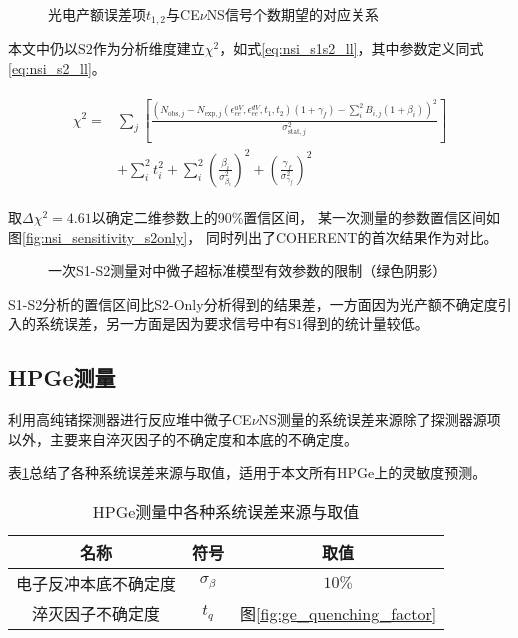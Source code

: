 \begin{figure}
  \centering
  
  \caption{\label{fig:exp_s1s2_t1t2} 光电产额误差项$t_{1,2}$与CE$\nu$NS信号个数期望的对应关系}
\end{figure}

本文中仍以$\mathrm{S2}$作为分析维度建立$\chi^2$，如式\ref{eq:nsi_s1s2_ll}，其中参数定义同式\ref{eq:nsi_s2_ll}。

\begin{align}
    \label{eq:nsi_s1s2_ll}
    \begin{split}
    \chi^2 =& \sum_j\left[\frac{\left(N_{\mathrm{obs},j} - N_{\mathrm{exp},j}(\epsilon^{uV}_{ee}, \epsilon^{dV}_{ee}, t_1, t_2)(1 + \gamma_f) 
    - \sum_{i}^2 B_{i,j}(1 + \beta_i)\right)^2}{\sigma^2_{\mathrm{stat},j}}\right] \\
    & + \sum_{i}^2 t_i^2 + \sum_{i}^2(\frac{\beta_i}{\sigma^2_{\beta_i}})^2 + (\frac{\gamma_f}{\sigma^2_{\gamma_f}})^2
    \end{split}
\end{align}

取$\Delta \chi^2=4.61$以确定二维参数上的90\%置信区间，
某一次测量的参数置信区间如图\ref{fig:nsi_sensitivity_s2only}，
同时列出了COHERENT的首次结果作为对比\cite{akimov_observation_2017}。

\begin{figure}
  \centering
  
  \caption{\label{fig:nsi_sensitivity_s1s2} 一次S1-S2测量对中微子超标准模型有效参数的限制（绿色阴影）}
\end{figure}

S1-S2分析的置信区间比S2-Only分析得到的结果差，一方面因为光产额不确定度引入的系统误差，另一方面是因为要求信号中有$\mathrm{S1}$得到的统计量较低。

\subsection{HPGe测量}

利用高纯锗探测器进行反应堆中微子CE$\nu$NS测量的系统误差来源除了探测器源项以外，主要来自淬灭因子的不确定度和本底的不确定度。

表\ref{tab:sys_error_ge}总结了各种系统误差来源与取值，适用于本文所有HPGe上的灵敏度预测。

\begin{table}
  \centering
  \caption{HPGe测量中各种系统误差来源与取值}
  \begin{tabular}{ccc}
    \toprule
    名称 & 符号 & 取值 \\
    \midrule
    电子反冲本底不确定度 & $\sigma_{\beta}$ & $10\%$ \\
    淬灭因子不确定度 & $t_q$ & 图\ref{fig:ge_quenching_factor} \\
    \bottomrule
  \end{tabular}
  \label{tab:sys_error_ge}
\end{table}

